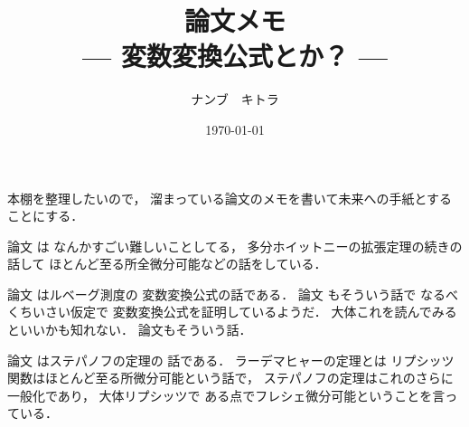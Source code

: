 \documentclass[leqno, a4paper, 12pt]{jsarticle}
\title{論文メモ
\large{\\--- 変数変換公式とか？ ---}
}
\author{ナンブ　キトラ}
\date{\today}
\begin{document}
\maketitle

本棚を整理したいので，
溜まっている論文のメモを書いて未来への手紙とすることにする．



論文
\cite{MR0043878}
は
なんかすごい難しいことしてる，
多分ホイットニーの拡張定理の続きの話して
ほとんど至る所全微分可能などの話をしている．

論文
\cite{MR0247011}
はルベーグ測度の
変数変換公式の話である．
論文
\cite{MR1201446}
もそういう話で
なるべくちいさい仮定で
変数変換公式を証明しているようだ．
大体これを読んでみるといいかも知れない．
論文\cite{MR2853669}もそういう話．


論文
\cite{MR3303031}
はステパノフの定理の
話である．
ラーデマヒャーの定理とは
リプシッツ関数はほとんど至る所微分可能という話で，
ステパノフの定理はこれのさらに一般化であり，
大体リプシッツで
ある点でフレシェ微分可能ということを言っている．

\nocite{*}


\end{document}
